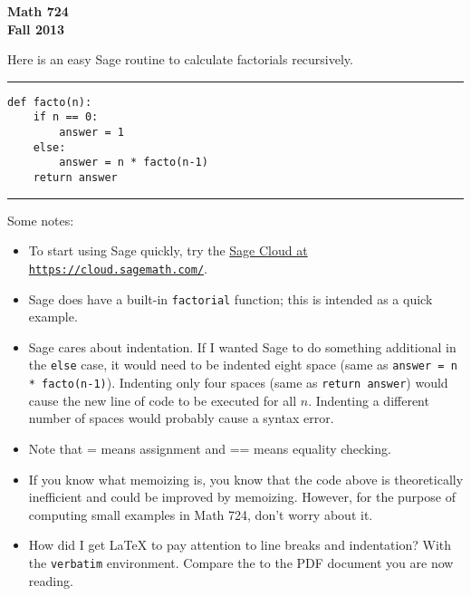 


{\bf Math 724\\ Fall 2013}

Here is an easy Sage routine to calculate factorials recursively.
\bigskip\hrule

\begin{verbatim}
def facto(n):
    if n == 0:
        answer = 1
    else:
        answer = n * facto(n-1)
    return answer
\end{verbatim}

\bigskip\hrule

Some notes:
\begin{itemize}
\item To start using Sage quickly, try the \href{https://cloud.sagemath.com/}{Sage Cloud at {\tt https://cloud.sagemath.com/}}.\\
\item Sage does have a built-in {\tt factorial} function; this is intended as a quick example.\\
\item Sage cares about indentation.  If I wanted Sage to do something additional in the {\tt else} case, it would need to be indented eight space (same as {\tt answer = n * facto(n-1)}).  Indenting only four spaces (same as {\tt return answer}) would cause the new line of code to be executed for all $n$.  Indenting a different number of spaces would probably cause a syntax error.\\
\item Note that = means assignment and == means equality checking.\\
\item If you know what memoizing is, you know that the code above is theoretically inefficient and could be improved by memoizing.  However, for the purpose of computing small examples in Math 724, don't worry about it.\\
\item How did I get LaTeX to pay attention to line breaks and indentation?
With the {\tt verbatim} environment.  Compare the \href{http://www.jlmartin.faculty.ku.edu/math724/sage-vignette.tex}{} to the PDF document you are now reading.
\end{itemize}
